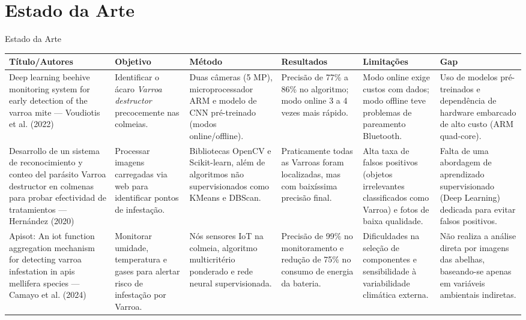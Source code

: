 \documentclass[aspectratio=169]{beamer}
\begin{document}
\section{Estado da Arte}

\begin{frame}[t]{Estado da Arte}
  \scriptsize
  
  \begin{table}
    \centering
    \tiny
    \begin{tabular}{|p{2.5cm}|p{2cm}|p{2cm}|p{2cm}|p{2cm}|p{1.5cm}|}
      \hline
      \textbf{Título/Autores} & \textbf{Objetivo} & \textbf{Método} & \textbf{Resultados} & \textbf{Limitações} & \textbf{Gap} \\
      \hline
      Deep learning beehive monitoring system for early detection of the varroa mite — Voudiotis et al. (2022) & 
            Identificar o ácaro \textit{Varroa destructor} precocemente nas colmeias. & 
            Duas câmeras (5 MP), microprocessador ARM e modelo de CNN pré-treinado (modos online/offline). & 
            Precisão de 77\% a 86\% no algoritmo; modo online 3 a 4 vezes mais rápido. & 
            Modo online exige custos com dados; modo offline teve problemas de pareamento Bluetooth. & 
            Uso de modelos pré-treinados e dependência de hardware embarcado de alto custo (ARM quad-core). \\
      \hline
      Desarrollo de un sistema de reconocimiento y conteo del parásito Varroa destructor en colmenas para probar efectividad de tratamientos — Hernández (2020) & 
            Processar imagens carregadas via web para identificar pontos de infestação. & 
            Bibliotecas OpenCV e Scikit-learn, além de algoritmos não supervisionados como KMeans e DBScan. & 
            Praticamente todas as Varroas foram localizadas, mas com baixíssima precisão final. & 
            Alta taxa de falsos positivos (objetos irrelevantes classificados como Varroa) e fotos de baixa qualidade. & 
            Falta de uma abordagem de aprendizado supervisionado (Deep Learning) dedicada para evitar falsos positivos. \\
      \hline
      Apisot: An iot function aggregation mechanism for detecting varroa infestation in apis mellifera species — Camayo et al. (2024) & 
            Monitorar umidade, temperatura e gases para alertar risco de infestação por Varroa. & 
            Nós sensores IoT na colmeia, algoritmo multicritério ponderado e rede neural supervisionada. & 
            Precisão de 99\% no monitoramento e redução de 75\% no consumo de energia da bateria. & 
            Dificuldades na seleção de componentes e sensibilidade à variabilidade climática externa. & 
            Não realiza a análise direta por imagens das abelhas, baseando-se apenas em variáveis ambientais indiretas. \\
      \hline
    \end{tabular}
  \end{table}
\end{frame}
\end{document}
